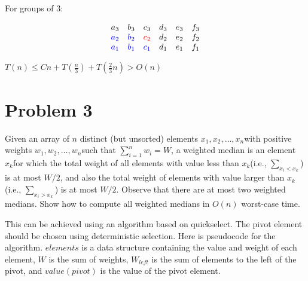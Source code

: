 \documentclass[10pt]{article}
\begin{document}
For groups of 3:

$$
\begin{matrix}
	a_3 & b_3 & c_3 & d_3 & e_3 & f_3\\
	\textcolor{blue}{a_2} & \textcolor{blue}{b_2} & \textcolor{red}{c_2} & d_2 & e_2 & f_2\\
	\textcolor{blue}{a_1} & \textcolor{blue}{b_1} & \textcolor{blue}{c_1} & d_1 & e_1 & f_1 
\end{matrix}
$$

$T(n) \leq Cn + T(\frac{n}{3}) + T(\frac{2}{3} n) > O(n)$

\section*{\normalsize Problem 3}

Given an array of $n$ distinct (but unsorted) elements $x_1, x_2, \dots, x_n$​ with positive weights $w_1, w_2, \dots, w_n$​ such that $\sum_{i=1}^{n} w_i = W$, a weighted median is an element $x_k$​ for which the total weight of all elements with value less than $x_k$​ (i.e., $\sum_{x_i < x_k}$) is at most $W/2$, and also the total weight of elements with value larger than $x_k$​ (i.e., $\sum_{x_i > x_k}$) is at most $W/2$. Observe that there are at most two weighted medians. Show how to compute all weighted medians in $O(n)$ worst-case time.
\bigskip

This can be achieved using an algorithm based on quickselect. The pivot element should be chosen using deterministic selection. Here is pseudocode for the algorithm. $elements$ is a data structure containing the value and weight of each element, $W$ is the sum of weights, $W_{left}$ is the sum of elements to the left of the pivot, and $value(pivot)$ is the value of the pivot element.
\smallskip

\newcommand{\forcond}{$i=0$ \KwTo $n$}
\end{document}
